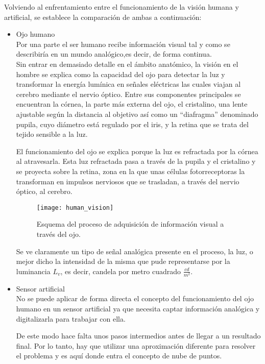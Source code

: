 Volviendo al enfrentamiento entre el funcionamiento de la visión humana y artificial, se establece la comparación de ambas a continuación:

\begin{itemize}
\item Ojo humano
\\
Por una parte el ser humano recibe información visual tal y como se describiría en un mundo analógico,es decir, de forma continua.
\\
Sin entrar en demasiado detalle en el ámbito anatómico, la visión en el hombre se explica como la capacidad del ojo para detectar la luz y transformar la energía lumínica en señales eléctricas las cuales viajan al cerebro mediante el nervio óptico. Entre sus componentes principales se encuentran la córnea, la parte más externa del ojo, el cristalino, una lente ajustable según la distancia al objetivo así como un ``diafragma'' denominado pupila, cuyo diámetro está regulado por el iris, y la retina que se trata del tejido sensible a la luz. 

El funcionamiento del ojo se explica\cite{ojo_humano} porque la luz es refractada por la córnea al atravesarla. Esta luz refractada pasa a través de la pupila y el cristalino y se proyecta sobre la retina, zona en la que unas células fotorreceptoras la transforman en impulsos nerviosos que se trasladan, a través del nervio óptico, al cerebro.


\begin{figure}[!htb]
\centering
{}
  \texttt{[image: human\_vision]}
  \caption{Esquema del proceso de adquisición de información visual a través del ojo.}\label{fig:human_vision}
\endminipage\hfill
\end{figure}

Se ve claramente un tipo de señal analógica presente en el proceso, la luz, o mejor dicho la intensidad de la misma que pude representarse por la luminancia $L_v$, es decir, candela por metro cuadrado $\frac{cd}{m^2}$.


\item Sensor artificial
\\
No se puede aplicar de forma directa el concepto del funcionamiento del ojo humano en un sensor artificial ya que necesita captar información analógica y digitalizarla para trabajar con ella.

De este modo hace falta unos pasos intermedios antes de llegar a un resultado final. Por lo tanto, hay que utilizar una aproximación diferente para resolver el problema y es aquí donde entra el concepto de nube de puntos. 
\end{itemize}


